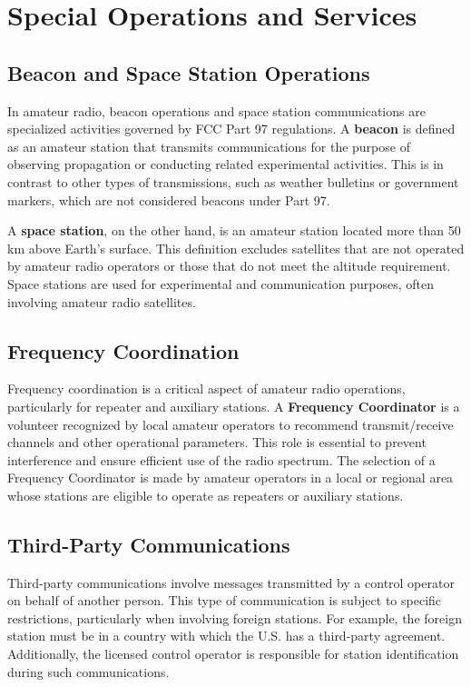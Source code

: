 \section{Special Operations and Services}
\label{sec:special_ops}

\subsection*{Beacon and Space Station Operations}
In amateur radio, beacon operations and space station communications are specialized activities governed by FCC Part 97 regulations. A \textbf{beacon} is defined as an amateur station that transmits communications for the purpose of observing propagation or conducting related experimental activities. This is in contrast to other types of transmissions, such as weather bulletins or government markers, which are not considered beacons under Part 97.

A \textbf{space station}, on the other hand, is an amateur station located more than 50 km above Earth's surface. This definition excludes satellites that are not operated by amateur radio operators or those that do not meet the altitude requirement. Space stations are used for experimental and communication purposes, often involving amateur radio satellites.

\subsection*{Frequency Coordination}
Frequency coordination is a critical aspect of amateur radio operations, particularly for repeater and auxiliary stations. A \textbf{Frequency Coordinator} is a volunteer recognized by local amateur operators to recommend transmit/receive channels and other operational parameters. This role is essential to prevent interference and ensure efficient use of the radio spectrum. The selection of a Frequency Coordinator is made by amateur operators in a local or regional area whose stations are eligible to operate as repeaters or auxiliary stations.

\subsection*{Third-Party Communications}
Third-party communications involve messages transmitted by a control operator on behalf of another person. This type of communication is subject to specific restrictions, particularly when involving foreign stations. For example, the foreign station must be in a country with which the U.S. has a third-party agreement. Additionally, the licensed control operator is responsible for station identification during such communications.

